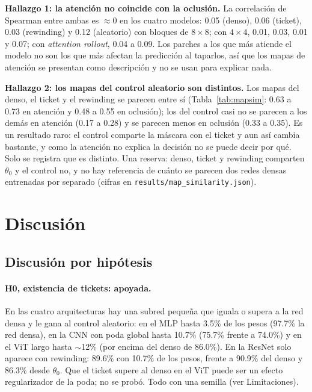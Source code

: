 \documentclass[11pt]{article}
\begin{document}
\textbf{Hallazgo 1: la atención no coincide con la oclusión.} La correlación de Spearman entre ambas es $\approx0$ en los cuatro modelos: 0.05 (denso), 0.06 (ticket), 0.03 (rewinding) y 0.12 (aleatorio) con bloques de $8\times8$; con $4\times4$, 0.01, 0.03, 0.01 y 0.07; con \textit{attention rollout}, 0.04 a 0.09. Los parches a los que más atiende el modelo no son los que más afectan la predicción al taparlos, así que los mapas de atención se presentan como descripción y no se usan para explicar nada.

\textbf{Hallazgo 2: los mapas del control aleatorio son distintos.} Los mapas del denso, el ticket y el rewinding se parecen entre sí (Tabla~\ref{tab:mapsim}: 0.63 a 0.73 en atención y 0.48 a 0.55 en oclusión); los del control casi no se parecen a los demás en atención (0.17 a 0.28) y se parecen menos en oclusión (0.33 a 0.35). Es un resultado raro: el control comparte la máscara con el ticket y aun así cambia bastante, y como la atención no explica la decisión no se puede decir por qué. Solo se registra que es distinto. Una reserva: denso, ticket y rewinding comparten $\theta_0$ y el control no, y no hay referencia de cuánto se parecen dos redes densas entrenadas por separado (cifras en \texttt{results/map\_similarity.json}).

\begin{table}[H]
\centering\small

\caption{Correlación de Spearman media entre los mapas de dos modelos (11.6\% de los pesos, 150 imágenes de prueba; 1 = mismo orden). Una sola corrida por modelo; la oclusión con color medio puede introducir artefactos.}
\label{tab:mapsim}
\end{table}

\newpage
\section{Discusión}
\subsection{Discusión por hipótesis}
\paragraph{H0, existencia de tickets: apoyada.} En las cuatro arquitecturas hay una subred pequeña que iguala o supera a la red densa y le gana al control aleatorio: en el MLP hasta 3.5\% de los pesos (97.7\% la red densa), en la CNN con poda global hasta 10.7\% (75.7\% frente a 74.0\%) y en el ViT largo hasta $\sim$12\% (por encima del denso de 86.0\%). En la ResNet solo aparece con rewinding: 89.6\% con 10.7\% de los pesos, frente a 90.9\% del denso y 86.3\% desde $\theta_0$. Que el ticket supere al denso en el ViT puede ser un efecto regularizador de la poda; no se probó. Todo con una semilla (ver Limitaciones).
\end{document}
